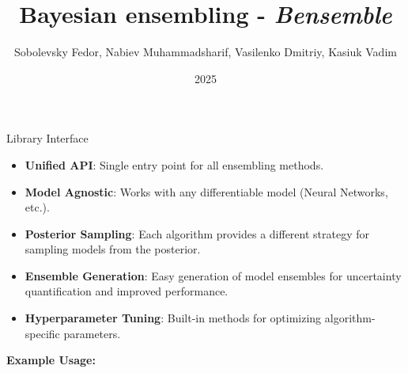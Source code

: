 \documentclass[10pt]{beamer}
\title{Bayesian ensembling - \textit{Bensemble}}
\author{Sobolevsky Fedor, Nabiev Muhammadsharif, Vasilenko Dmitriy, Kasiuk Vadim}
\institute{Moscow Institute of Physics and Technology}
\date{2025}
\begin{document}
\begin{frame}
\titlepage
\end{frame}

\begin{frame}{Library Interface}
\centering
\vspace{0.5cm}

\begin{itemize}
    \item \textbf{Unified API}: Single entry point for all ensembling methods.
    \item \textbf{Model Agnostic}: Works with any differentiable model (Neural Networks, etc.).
    \item \textbf{Posterior Sampling}: Each algorithm provides a different strategy for sampling models from the posterior.
    \item \textbf{Ensemble Generation}: Easy generation of model ensembles for uncertainty quantification and improved performance.
    \item \textbf{Hyperparameter Tuning}: Built-in methods for optimizing algorithm-specific parameters.
\end{itemize}

\textbf{Example Usage:}
\end{frame}
\end{document}

